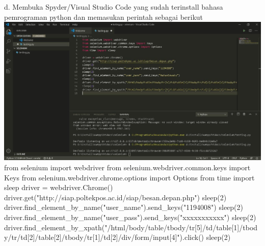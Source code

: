 \documentclass{article}
\begin{document}
            \newline
        d. Membuka Spyder/Visual Studio Code yang sudah terinstall bahasa pemrograman python dan memasukan perintah sebagai berikut
        \newline
            \includegraphics[scale=0.3]{33.1d.jpg}
            \newline
            from selenium import webdriver
            \newline
            from selenium.webdriver.common.keys import Keys
            \newline
            from selenium.webdriver.chrome.options import Options
            \newline
            from time import sleep
            \newline
            \newline
            driver = webdriver.Chrome()
            \newline
            driver.get("http://siap.poltekpos.ac.id/siap/besan.depan.php")
            \newline
            sleep(2)
            \newline
            driver.find_element_by_name("user_name").send_keys("1194008")
            \newline
            sleep(2)
            \newline
            driver.find_element_by_name("user_pass").send_keys("xxxxxxxxxxx")
            \newline
            sleep(2)
            \newline
            driver.find_element_by_xpath("/html/body/table/tbody/tr[5]/td/table[1]/tbody/tr/td[2]/table[2]/tbody/tr[1]/td[2]/div/form/input[4]").click()
            \newline
            sleep(2)
            \newline
\end{document}
